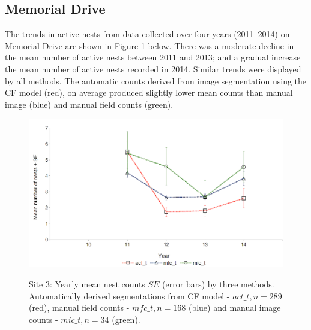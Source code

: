\subsection{Memorial Drive}\label{sec:memorial-drive}
The trends in active nests from data collected  over four years (2011--2014) on Memorial Drive  are shown in Figure \ref{fig:changebysite3} below. There was a moderate decline in the mean number of active nests between 2011 and 2013; and a gradual increase the mean number of active nests recorded in 2014. Similar trends were displayed by all methods. The automatic counts derived from image segmentation using the CF model (red), on average produced slightly lower mean counts than manual image (blue) and manual field counts (green).

\begin{figure}\myfloatalign
\includegraphics[width=0.9\linewidth]{gfx6/change/changebysite3} \\
\caption[Yearly nest counts site 3.]{Site 3:  Yearly mean nest counts \textpm $SE$ (error bars) by three methods. Automatically derived segmentations from CF model - $ act\_t, n = 289 $ (red), manual field counts - $ mfc\_t, n = 168 $ (blue) and manual image counts - $ mic\_t, n = 34 $ (green).}\label{fig:changebysite3}
\end{figure}
\clearpage


